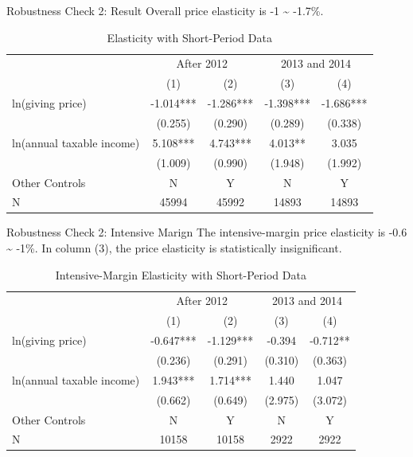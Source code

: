 \documentclass[
  ignorenonframetext,
]{beamer}
\begin{document}
\begin{frame}{Robustness Check 2: Result}
\protect\hypertarget{robustness-check-2-result}{}
Overall price elasticity is -1 \textasciitilde{} -1.7\%.

\begin{table}

\caption{\label{tab:kableShortElasticity1Slide}Elasticity with Short-Period Data}
\centering
\fontsize{8}{10}\selectfont
\begin{tabular}[t]{lcccc}
\toprule
\multicolumn{1}{c}{ } & \multicolumn{2}{c}{After 2012} & \multicolumn{2}{c}{2013 and 2014} \\
\cmidrule(l{3pt}r{3pt}){2-3} \cmidrule(l{3pt}r{3pt}){4-5}
 & (1) & (2) & (3) & (4)\\
\midrule
ln(giving price) & -1.014*** & -1.286*** & -1.398*** & -1.686***\\
 & (0.255) & (0.290) & (0.289) & (0.338)\\
ln(annual taxable income) & 5.108*** & 4.743*** & 4.013** & 3.035\\
 & (1.009) & (0.990) & (1.948) & (1.992)\\
Other Controls & N & Y & N & Y\\
N & 45994 & 45992 & 14893 & 14893\\
\bottomrule
\end{tabular}
\end{table}
\end{frame}

\begin{frame}{Robustness Check 2: Intensive Marign}
\protect\hypertarget{robustness-check-2-intensive-marign}{}
The intensive-margin price elasticity is -0.6 \textasciitilde{} -1\%.
In column (3), the price elasticity is statistically insignificant.

\begin{table}

\caption{\label{tab:kableShortElasticity2Slide1}Intensive-Margin Elasticity with Short-Period Data}
\centering
\fontsize{8}{10}\selectfont
\begin{tabular}[t]{lcccc}
\toprule
\multicolumn{1}{c}{ } & \multicolumn{2}{c}{After 2012} & \multicolumn{2}{c}{2013 and 2014} \\
\cmidrule(l{3pt}r{3pt}){2-3} \cmidrule(l{3pt}r{3pt}){4-5}
 & (1) & (2) & (3) & (4)\\
\midrule
ln(giving price) & -0.647*** & -1.129*** & -0.394 & -0.712**\\
 & (0.236) & (0.291) & (0.310) & (0.363)\\
ln(annual taxable income) & 1.943*** & 1.714*** & 1.440 & 1.047\\
 & (0.662) & (0.649) & (2.975) & (3.072)\\
Other Controls & N & Y & N & Y\\
N & 10158 & 10158 & 2922 & 2922\\
\bottomrule
\end{tabular}
\end{table}
\end{frame}
\end{document}
